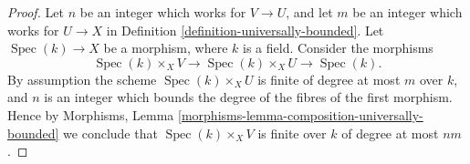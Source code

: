\documentclass{stacks-project}
\theoremstyle{plain}
\theoremstyle{definition}
\theoremstyle{remark}
\numberwithin{equation}{subsection}
\def\Spec{\mathop{\mathrm{Spec}}}
\begin{document}
\begin{proof}
Let $n$ be an integer which works for $V \to U$, and let $m$ be
an integer which works for $U \to X$ in
Definition \ref{definition-universally-bounded}.
Let $\Spec(k) \to X$ be a morphism, where $k$ is a field.
Consider the morphisms
$$
\Spec(k) \times_X V
\longrightarrow
\Spec(k) \times_X U
\longrightarrow
\Spec(k).
$$
By assumption the scheme $\Spec(k) \times_X U$
is finite of degree at most $m$ over $k$, and $n$ is an integer which
bounds the degree of the fibres of the first morphism. Hence by
Morphisms, Lemma \ref{morphisms-lemma-composition-universally-bounded}
we conclude that $\Spec(k) \times_X V$ is finite over $k$
of degree at most $nm$.
\end{proof}
\end{document}
